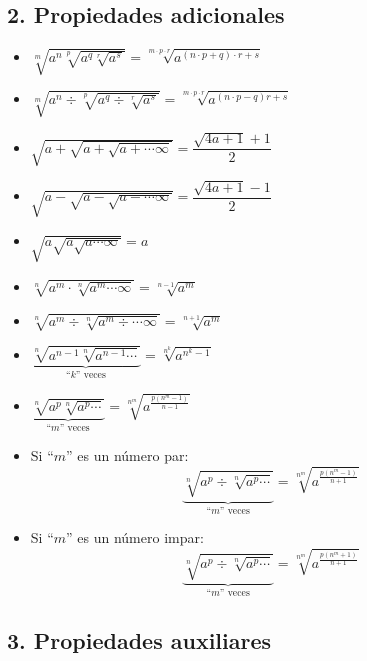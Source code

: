 \documentclass[11pt,a4paper]{article}
\begin{document}
\subsection*{2. Propiedades adicionales}

\begin{itemize}[label=$\ast$]
  \item $\sqrt[m]{a^n\sqrt[p]{a^q\sqrt[r]{a^s}}} = \sqrt[m\cdot p\cdot r]{a^{(n\cdot p+q)\cdot r+s}}$
  \item $\sqrt[m]{a^n\div\sqrt[p]{a^q\div\sqrt[r]{a^s}}} = \sqrt[m\cdot p\cdot r]{a^{(n\cdot p-q)r+s}}$
  \item $\sqrt{a+\sqrt{a+\sqrt{a+\cdots\infty}}} = \dfrac{\sqrt{4a+1}+1}{2}$
  \item $\sqrt{a-\sqrt{a-\sqrt{a-\cdots\infty}}} = \dfrac{\sqrt{4a+1}-1}{2}$
  \item $\sqrt{a\sqrt{a\sqrt{a\cdots\infty}}} = a$
  \item $\sqrt[n]{a^m\cdot\sqrt[n]{a^m\cdots\infty}} = \sqrt[n-1]{a^m}$
  \item $\sqrt[n]{a^m\div\sqrt[n]{a^m\div\cdots\infty}} = \sqrt[n+1]{a^m}$
  \item $\underbrace{\sqrt[n]{a^{n-1}\sqrt[n]{a^{n-1}\cdots}}}_{\text{``$k$'' veces}} = \sqrt[n^k]{a^{n^k-1}}$
  \item $\underbrace{\sqrt[n]{a^{p}\sqrt[n]{a^{p}\cdots}}}_{\text{``$m$'' veces}} = \sqrt[n^m]{a^{\frac{p(n^m-1)}{n-1}}}$
  \item Si ``$m$'' es un número par:
  \[\underbrace{\sqrt[n]{a^{p}\div\sqrt[n]{a^{p}\cdots}}}_{\text{``$m$'' veces}} = \sqrt[n^m]{a^{\frac{p(n^m-1)}{n+1}}}\]
  \item Si ``$m$'' es un número impar:
  \[\underbrace{\sqrt[n]{a^{p}\div\sqrt[n]{a^{p}\cdots}}}_{\text{``$m$'' veces}} = \sqrt[n^m]{a^{\frac{p(n^m+1)}{n+1}}}\]
\end{itemize}

\subsection*{3. Propiedades auxiliares}
\end{document}
